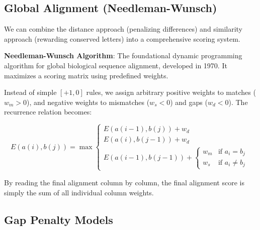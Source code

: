 \documentclass[11pt,a4paper]{article}
\begin{document}
\subsection{Global Alignment (Needleman-Wunsch)}

We can combine the distance approach (penalizing differences) and similarity approach (rewarding conserved letters) into a comprehensive scoring system. 

\begin{important}
\textbf{Needleman-Wunsch Algorithm}: The foundational dynamic programming algorithm for global biological sequence alignment, developed in 1970. It maximizes a scoring matrix using predefined weights.
\end{important}

Instead of simple \([+1, 0]\) rules, we assign arbitrary positive weights to matches (\(w_m > 0\)), and negative weights to mismatches (\(w_s < 0\)) and gaps (\(w_d < 0\)). The recurrence relation becomes:

\begin{equation}
E(a(i), b(j)) = \max \begin{cases}
E(a(i-1), b(j)) + w_d \\
E(a(i), b(j-1)) + w_d \\
E(a(i-1), b(j-1)) + \begin{cases} w_m & \text{if } a_i = b_j \\ w_s & \text{if } a_i \neq b_j \end{cases}
\end{cases}
\end{equation}

By reading the final alignment column by column, the final alignment score is simply the sum of all individual column weights.

\subsection{Gap Penalty Models}
\end{document}
